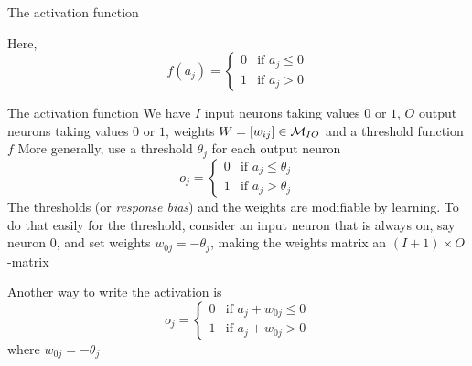 \documentclass[aspectratio=169]{beamer}\usepackage[]{graphicx}\usepackage[]{xcolor}
\begin{document}
\begin{frame}{The activation function}
    \begin{center}
        \def\hhskip{8cm}
        \def\vvskip{2cm}
    \end{center}
    Here,
    \[
        f(a_j)= \begin{cases}
            0 & \text{if }a_j\leq 0 \\
            1 & \text{if }a_j>0
        \end{cases}
    \]
\end{frame}

\begin{frame}{The activation function}
    We have $I$ input neurons taking values $0$ or $1$, $O$ output neurons taking values $0$ or $1$, weights $W=[w_{ij}]\in\mathcal{M}_{IO}$ and a threshold function $f$
    \vfill
    More generally, use a threshold $\theta_j$ for each output neuron
    \[
        o_j= \begin{cases}
            0 & \text{if }a_j\leq \theta_j \\
            1 & \text{if }a_j>\theta_j
        \end{cases}
    \]
    \vfill
    The thresholds (or \emph{response bias}) and the weights are modifiable by learning. To do that easily for the threshold, consider an input neuron that is always on, say neuron 0, and set weights $w_{0j}=-\theta_j$, making the weights matrix an $(I+1)\times O$-matrix
\end{frame}


\begin{frame}
    Another way to write the activation is 
    \[
        o_j= \begin{cases}
            0 & \text{if }a_j+w_{0j}\leq 0 \\
            1 & \text{if }a_j+w_{0j}>0
        \end{cases}
    \]
    where $w_{0j}=-\theta_j$
\end{frame}
\end{document}
